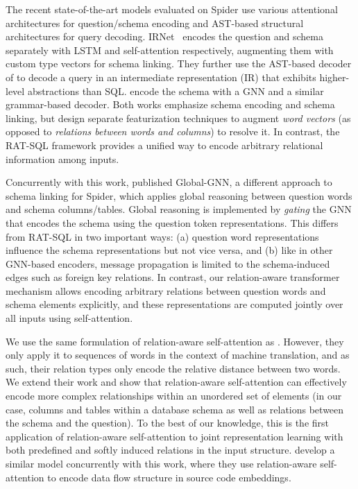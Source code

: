 \documentclass[11pt,a4paper,final]{article}
\begin{document}
The recent state-of-the-art models evaluated on Spider use various attentional architectures for question/schema
encoding and AST-based structural architectures for query decoding.
IRNet~\citep{irnet} encodes the question and schema separately with LSTM and self-attention respectively, augmenting
them with custom type vectors for schema linking.
They further use the AST-based decoder of \citet{yinSyntacticNeuralModel2017a} to decode a query in an intermediate
representation (IR) that exhibits higher-level abstractions  than SQL.
\citet{gnnsql} encode the schema with a GNN and a similar grammar-based decoder.
Both works emphasize schema encoding and schema linking, but design separate featurization
techniques to augment \emph{word vectors} (as opposed to \emph{relations between words and columns}) to resolve it.
In contrast, the RAT-SQL framework provides a unified way to encode arbitrary relational information among inputs.

Concurrently with this work, \citet{bogin2019global} published Global-GNN, a different approach to schema linking for
Spider, which applies global reasoning between question words and schema columns/tables.
Global reasoning is implemented by \emph{gating} the GNN that encodes the schema using the question token representations.
This differs from RAT-SQL in two important ways:
(a) question word representations influence the schema representations but not vice versa, and
(b) like in other GNN-based encoders, message propagation is limited to the schema-induced edges such as
foreign key relations.
In contrast, our relation-aware transformer mechanism allows encoding arbitrary relations between question words and
schema elements explicitly, and these representations are computed jointly over all inputs using self-attention.


We use the same formulation of relation-aware self-attention as \citet{shawSelfAttentionRelativePosition2018}.
However, they only apply it to sequences of words in the context of machine translation, and as such, their relation types only encode the relative distance between two words.
We extend their work and show that relation-aware self-attention can effectively encode more complex relationships within an unordered set of elements (in our case, columns and tables within a database schema as well as relations between the schema and the question).
To the best of our knowledge, this is the first application of relation-aware self-attention to joint representation learning with both predefined and softly induced relations in the input structure.
\citet{Hellendoorn2020Global} develop a similar model concurrently with this work, where they use relation-aware self-attention to encode data flow structure in source code embeddings.
\end{document}
